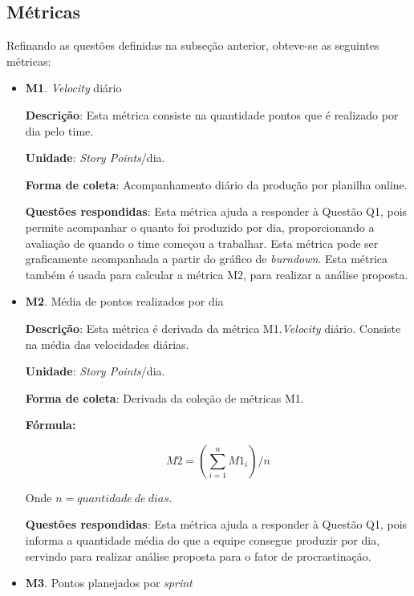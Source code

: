       
      \subsection{Métricas}
	
	Refinando as questões definidas na subseção anterior, obteve-se as seguintes métricas:
	      
	\begin{itemize}
	 
	 \item \textbf{M1}. \textit{Velocity} diário
	 
	   \subitem \textbf{Descrição}: Esta métrica consiste na quantidade pontos que é realizado por dia pelo time.
	   
	   \subitem \textbf{Unidade}: \textit{Story Points}/dia.
	   
	   \subitem \textbf{Forma de coleta}: Acompanhamento diário da produção por planilha online.
	   
	   \subitem \textbf{Questões respondidas}: Esta métrica ajuda a responder à Questão Q1, pois permite acompanhar o quanto
		    foi produzido por dia, proporcionando a avaliação de quando o time começou a trabalhar. Esta métrica pode ser 
		    graficamente acompanhada a partir do gráfico de \textit{burndown}. Esta métrica também é usada para calcular a
		    métrica M2, para realizar a análise proposta.
	 
	 \item \textbf{M2}. Média de pontos realizados por dia
	   
	   \subitem \textbf{Descrição}: Esta métrica é derivada da métrica M1.\textit{Velocity} diário. Consiste na média das velocidades
		    diárias.
	   
	   \subitem \textbf{Unidade}: \textit{Story Points}/dia.
	   
	   \subitem \textbf{Forma de coleta}: Derivada da coleção de métricas M1.
	   
	      \subsubitem \textbf{Fórmula:} 
	      
		$$ M2 = (\sum\limits_{i=1}^{n}M1_i)/n $$
		
	      \subsubitem Onde $n = quantidade\ de\ dias$.
	   
	   \subitem \textbf{Questões respondidas}: Esta métrica ajuda a responder à Questão Q1, pois informa a quantidade média do 
		    que a equipe consegue produzir por dia, servindo para realizar análise proposta para o fator de procrastinação.
	  
	 \item \textbf{M3}. Pontos planejados por \textit{sprint}
	  

\end{itemize}
